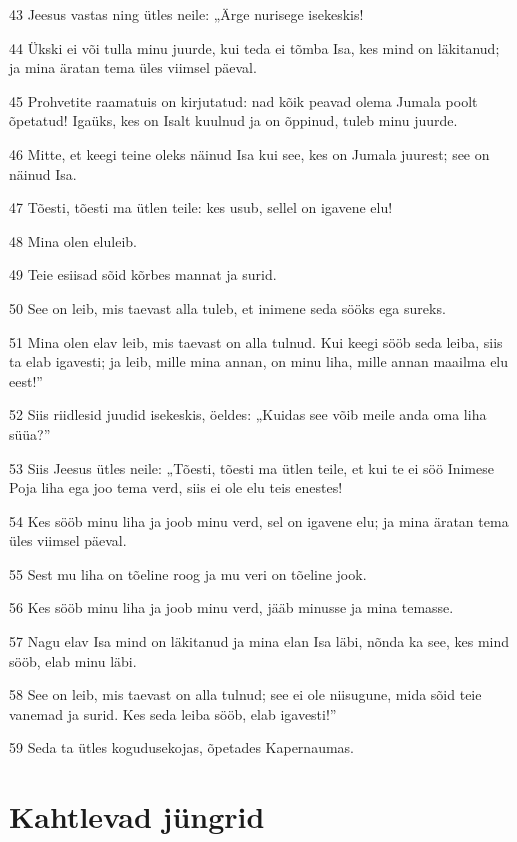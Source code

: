 \par 43 Jeesus vastas ning ütles neile: „Ärge nurisege isekeskis!
\par 44 Ükski ei või tulla minu juurde, kui teda ei tõmba Isa, kes mind on läkitanud; ja mina äratan tema üles viimsel päeval.
\par 45 Prohvetite raamatuis on kirjutatud: nad kõik peavad olema Jumala poolt õpetatud! Igaüks, kes on Isalt kuulnud ja on õppinud, tuleb minu juurde.
\par 46 Mitte, et keegi teine oleks näinud Isa kui see, kes on Jumala juurest; see on näinud Isa.
\par 47 Tõesti, tõesti ma ütlen teile: kes usub, sellel on igavene elu!
\par 48 Mina olen eluleib.
\par 49 Teie esiisad sõid kõrbes mannat ja surid.
\par 50 See on leib, mis taevast alla tuleb, et inimene seda sööks ega sureks.
\par 51 Mina olen elav leib, mis taevast on alla tulnud. Kui keegi sööb seda leiba, siis ta elab igavesti; ja leib, mille mina annan, on minu liha, mille annan maailma elu eest!”
\par 52 Siis riidlesid juudid isekeskis, öeldes: „Kuidas see võib meile anda oma liha süüa?”
\par 53 Siis Jeesus ütles neile: „Tõesti, tõesti ma ütlen teile, et kui te ei söö Inimese Poja liha ega joo tema verd, siis ei ole elu teis enestes!
\par 54 Kes sööb minu liha ja joob minu verd, sel on igavene elu; ja mina äratan tema üles viimsel päeval.
\par 55 Sest mu liha on tõeline roog ja mu veri on tõeline jook.
\par 56 Kes sööb minu liha ja joob minu verd, jääb minusse ja mina temasse.
\par 57 Nagu elav Isa mind on läkitanud ja mina elan Isa läbi, nõnda ka see, kes mind sööb, elab minu läbi.
\par 58 See on leib, mis taevast on alla tulnud; see ei ole niisugune, mida sõid teie vanemad ja surid. Kes seda leiba sööb, elab igavesti!”
\par 59 Seda ta ütles kogudusekojas, õpetades Kapernaumas.

\section*{Kahtlevad jüngrid}


